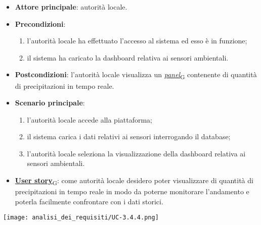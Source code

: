 \begin{itemize}
	\item \textbf{Attore principale}: autorità locale.
	\item \textbf{Precondizioni}:
	      \begin{enumerate}
		      \item l'autorità locale ha effettuato l'accesso al sistema ed esso è in funzione;
		      \item il sistema ha caricato la dashboard relativa ai sensori ambientali.
	      \end{enumerate}
	\item \textbf{Postcondizioni}: l'autorità locale visualizza un \href{https://7last.github.io/docs/pb/documentazione-interna/glossario\#panel}{\textit{panel}\textsubscript{G}} contenente di quantità di precipitazioni in tempo reale.
	\item \textbf{Scenario principale}:
	      \begin{enumerate}
		      \item l'autorità locale accede alla piattaforma;
		      \item il sistema carica i dati relativi ai sensori interrogando il database;
		      \item l'autorità locale seleziona la visualizzazione della dashboard relativa ai sensori ambientali.
	      \end{enumerate}
	\item \href{https://7last.github.io/docs/pb/documentazione-interna/glossario\#user-story}{\textbf{User story}\textsubscript{G}}:
	      come autorità locale desidero poter visualizzare di quantità di precipitazioni in tempo reale in modo da poterne monitorare l'andamento
	      e poterla facilmente confrontare con i dati storici.
\end{itemize}
\begin{center}
	\texttt{[image: analisi\_dei\_requisiti/UC-3.4.4.png]}
\end{center}


